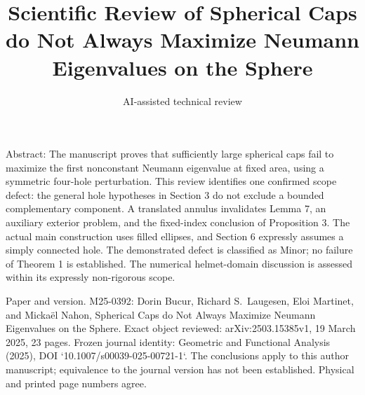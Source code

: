 \documentclass[10pt]{article}
\title{Scientific Review of
Spherical Caps do Not Always Maximize
Neumann Eigenvalues on the Sphere}
\author{AI-assisted technical review}
\date{}
\begin{document}
\maketitle
Abstract: The manuscript proves that sufficiently large spherical caps fail to maximize the first nonconstant Neumann eigenvalue at fixed area, using a symmetric four-hole perturbation. This review identifies one confirmed scope defect: the general hole hypotheses in Section 3 do not exclude a bounded complementary component. A translated annulus invalidates Lemma 7, an auxiliary exterior problem, and the fixed-index conclusion of Proposition 3. The actual main construction uses filled ellipses, and Section 6 expressly assumes a simply connected hole. The demonstrated defect is classified as Minor; no failure of Theorem 1 is established. The numerical helmet-domain discussion is assessed within its expressly non-rigorous scope.\par
Paper and version. M25-0392: Dorin Bucur, Richard S. Laugesen, Eloi Martinet, and Mickaël Nahon, Spherical Caps do Not Always Maximize Neumann Eigenvalues on the Sphere. Exact object reviewed: arXiv:2503.15385v1, 19 March 2025, 23 pages. Frozen journal identity: Geometric and Functional Analysis (2025), DOI `10.1007/s00039-025-00721-1`. The conclusions apply to this author manuscript; equivalence to the journal version has not been established. Physical and printed page numbers agree.\par
\end{document}
